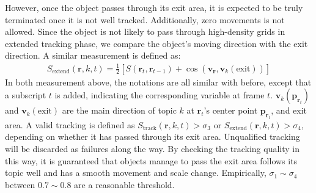 However, once the object passes through its exit area, it is expected to be truly terminated once it is not well tracked. 
Additionally, zero movements is not allowed. Since the object is not likely to pass through high-density grids in extended tracking phase, we compare the object's moving direction with the exit direction. A similar measurement is defined as:
\begin{align}
    S_{\text{extend}}(\bm{r}, k, t) = \frac{1}{2}\left[S(\bm{r}_t, \bm{r}_{t-1}) + \cos(\bm{v_r}, \bm{v}_k(\text{exit}))\right]\label{eq:track_ext_score}
\end{align}
In both measurement above, the notations are all similar with before, except that a subscript $t$ is added, indicating the corresponding variable at frame $t$. 
$\bm{v}_k(\bm{p}_{\bm{r}_t})$ and $\bm{v}_k(\text{exit})$ are the main direction of topic $k$ at $\bm{r}_{t}$'s center point $\bm{p}_{\bm{r}_t}$, and exit area.
A valid tracking is defined as $S_{\text{track}}(\bm{r}, k, t)>\sigma_{3}$ or $S_{\text{extend}}(\bm{r}, k, t)>\sigma_{4}$, depending on whether it has passed through its exit area. Unqualified tracking will be discarded as failures along the way.
By checking the tracking quality in this way, it is guaranteed that objects manage to pass the exit area follows its topic well and has a smooth movement and scale change. 
Empirically, $\sigma_1\sim\sigma_{4}$ between $0.7\sim0.8$ are a reasonable threshold.
